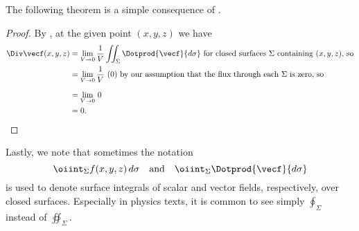 The following theorem is a simple consequence of .


\begin{proof}
 By , at the given point $(x,y,z)$ we have 
 \begin{align*}
  \Div\vecf(x,y,z) &= \lim_{V \to 0} \frac{1}{V} \iint_{\Sigma} \Dotprod{\vecf}{d\sigma}
   \text{ for closed surfaces $\Sigma$ containing $(x,y,z)$, so}\\
    &= \lim_{V \to 0} \frac{1}{V} \,\, (0) \text{ by our assumption that the flux through each $\Sigma$ is
    zero, so}\\[6pt]
    &= \lim_{V \to 0} \, 0\\
    &= 0 .\qedhere
 \end{align*}
\end{proof}

Lastly, we note that sometimes the notation
\[
 \oiint_{\Sigma} f(x,y,z)\,d\sigma \quad\text{and}\quad \oiint_{\Sigma} \Dotprod{\vecf}{d\sigma}
\]
is used to denote surface integrals of scalar and vector fields, respectively, over closed surfaces.\index{$\oiint_{\Sigma}$} Especially in physics texts, it is common to see simply $\oint_{\Sigma}$ instead of $\oiint_{\Sigma}$.

